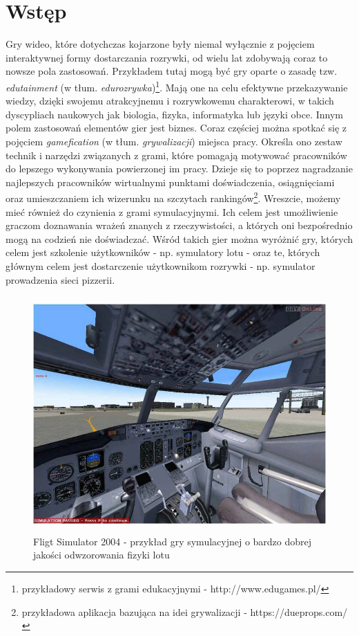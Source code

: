 \chapter*{Wstęp}
Gry wideo, które dotychczas kojarzone były niemal wyłącznie z pojęciem interaktywnej formy dostarczania rozrywki, od wielu lat zdobywają coraz to nowsze pola zastosowań. Przykładem tutaj mogą być gry oparte o zasadę tzw. \emph{edutainment} (w tłum. \emph{edurozrywka})\footnote{przykładowy serwis z grami edukacyjnymi - http://www.edugames.pl/}. Mają one na celu efektywne przekazywanie wiedzy, dzięki swojemu atrakcyjnemu i rozrywkowemu charakterowi, w takich dyscypliach naukowych jak biologia, fizyka, informatyka lub języki obce. 
Innym polem zastosowań elementów gier jest biznes. Coraz częściej można spotkać się z pojęciem \emph{gamefication} (w tłum. \emph{grywalizacji}) miejsca pracy. Określa ono zestaw technik i narzędzi związanych z grami, które pomagają motywować pracowników do lepszego wykonywania powierzonej im pracy. Dzieje się to poprzez nagradzanie najlepszych pracowników wirtualnymi punktami doświadczenia, osiągnięciami oraz umieszczaniem ich wizerunku na szczytach rankingów\footnote{przykładowa aplikacja bazująca na idei grywalizacji - https://dueprops.com/}.
Wreszcie, możemy mieć również do czynienia z grami symulacyjnymi. Ich celem jest umożliwienie graczom doznawania wrażeń znanych z rzeczywistości, a których oni bezpośrednio mogą na codzień nie doświadczać. Wśród takich gier można wyróżnić gry, których celem jest szkolenie użytkowników - np. symulatory lotu - oraz te, których głównym celem jest dostarczenie użytkownikom rozrywki - np. symulator prowadzenia sieci pizzerii.

\begin{figure}
\begin{center}
	\includegraphics[width=120mm,height=90mm]{images/flightSim}
	\caption{Fligt Simulator 2004 - przykład gry symulacyjnej o bardzo dobrej jakości odwzorowania fizyki lotu}
\end{center}
\end{figure}

